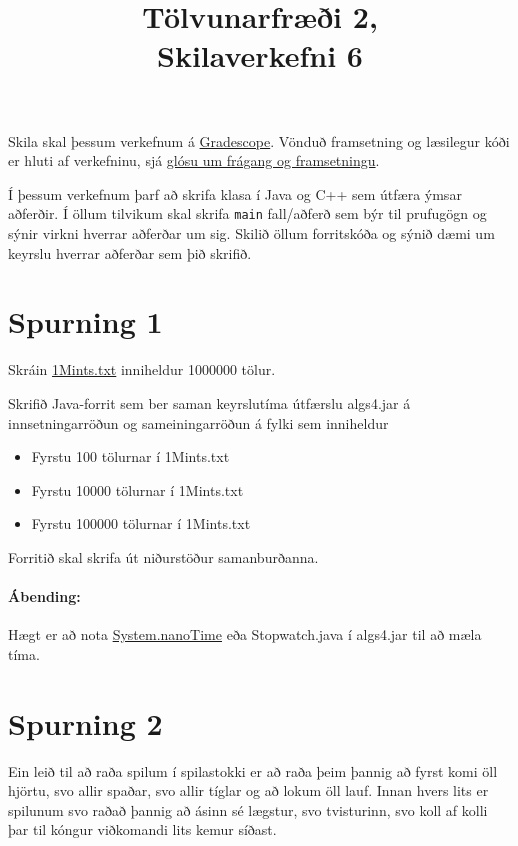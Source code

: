 \documentclass{article}
\title{Tölvunarfræði 2, \semester \\ Skilaverkefni 6}
\author{}
\begin{document}
\maketitle
{}

Skila skal þessum verkefnum á \href{https://gradescope.com/courses/5640}{Gradescope}. Vönduð framsetning og læsilegur kóði er hluti af verkefninu, sjá \href{https://piazza.com/class/ixkicfen49l111?cid=52}{glósu um frágang og framsetningu}.

Í þessum verkefnum þarf að skrifa klasa í Java og C++ sem útfæra ýmsar aðferðir. Í öllum tilvikum skal skrifa \texttt{main} fall/aðferð sem býr til prufugögn og sýnir virkni hverrar aðferðar um sig. Skilið öllum forritskóða og sýnið dæmi um keyrslu hverrar aðferðar sem þið skrifið.

\section{Spurning 1}
Skráin \href{http://algs4.cs.princeton.edu/14analysis/1Mints.txt}{1Mints.txt} inniheldur 1000000 tölur.

Skrifið Java-forrit sem ber saman keyrslutíma útfærslu algs4.jar á innsetningarröðun og sameiningarröðun á fylki sem inniheldur

\begin{itemize}
 \item Fyrstu 100 tölurnar í 1Mints.txt
 \item Fyrstu 10000 tölurnar í 1Mints.txt
 \item Fyrstu 100000 tölurnar í 1Mints.txt
\end{itemize}

Forritið skal skrifa út niðurstöður samanburðanna.

\paragraph{Ábending:} Hægt er að nota \href{https://docs.oracle.com/javase/8/docs/api/java/lang/System.html#nanoTime--}{System.nanoTime} eða Stopwatch.java í algs4.jar til að mæla tíma.

\section{Spurning 2}
Ein leið til að raða spilum í spilastokki er að raða þeim þannig að fyrst komi öll hjörtu, svo allir spaðar, svo allir tíglar og að lokum öll lauf. 
Innan hvers lits er spilunum svo raðað þannig að ásinn sé lægstur, svo tvisturinn, svo koll af kolli þar til kóngur viðkomandi lits kemur síðast.
\end{document}
